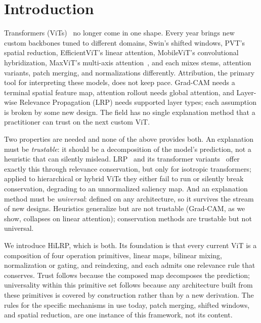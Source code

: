 \documentclass[lettersize,journal]{IEEEtran}
\begin{document}
\section{Introduction}
\label{sec:introduction}
 Transformers (ViTs)~\cite{dosovitskiy2021vit} no longer come in one shape. Every year brings new custom backbones tuned to different domains, Swin's shifted windows, PVT's spatial reduction, EfficientViT's linear attention, MobileViT's convolutional hybridization, MaxViT's multi-axis attention~\cite{liu2021swin,wang2021pvt,cai2023efficientvit}, and each mixes stems, attention variants, patch merging, and normalizations differently. Attribution, the primary tool for interpreting these models, does not keep pace. Grad-CAM needs a terminal spatial feature map, attention rollout needs global attention, and Layer-wise Relevance Propagation (LRP) needs supported layer types; each assumption is broken by some new design. The field has no single explanation method that a practitioner can trust on the next custom ViT.

Two properties are needed and none of the above provides both. An explanation must be \emph{trustable}: it should be a decomposition of the model's prediction, not a heuristic that can silently mislead. LRP~\cite{bach2015lrp} and its transformer variants~\cite{chefer2021transformer,achtibat2024attnlrp} offer exactly this through relevance conservation, but only for isotropic transformers; applied to hierarchical or hybrid ViTs they either fail to run or silently break conservation, degrading to an unnormalized saliency map. And an explanation method must be \emph{universal}: defined on any architecture, so it survives the stream of new designs. Heuristics generalize but are not trustable (Grad-CAM, as we show, collapses on linear attention); conservation methods are trustable but not universal.

We introduce HiLRP, which is both. Its foundation is that every current ViT is a composition of four operation primitives, linear maps, bilinear mixing, normalization or gating, and reindexing, and each admits one relevance rule that conserves. Trust follows because the composed map decomposes the prediction; universality within this primitive set follows because any architecture built from these primitives is covered by construction rather than by a new derivation. The rules for the specific mechanisms in use today, patch merging, shifted windows, and spatial reduction, are one instance of this framework, not its content.
\end{document}
